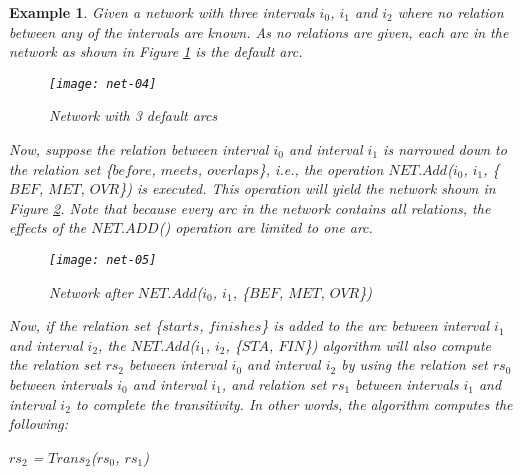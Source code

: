 \documentclass[11pt]{report}
\newtheorem{vexample}{Example}[chapter]
\newenvironment{vquote}
{
  \begin{list}{}{\leftmargin 1em}\item[]
}
{
  \end{list}
}
\begin{document}
          \begin{vexample}
            \label{ex-4-1}
            Given a network with three intervals $i_0$, $i_1$ and $i_2$ where
            no relation between any of the intervals are known. As no relations
            are given, each arc in the network as shown in Figure
            \ref{fig-net-ex-04} is the default arc.

            \begin{figure}[tbhp]
              \begin{center}
                \texttt{[image: net-04]}
                \caption{Network with 3 default arcs}
                \label{fig-net-ex-04}
              \end{center}
            \end{figure}

            Now, suppose the relation between interval $i_0$ and interval $i_1$
            is narrowed down to the relation set \{$before$, $meets$,
            $overlaps$\}, i.e., the operation $NET.Add$($i_0$, $i_1$, \{$BEF$,
            $MET$, $OVR$\}) is executed. This operation will yield the network
            shown in Figure \ref{fig-net-ex-05}. Note that because every arc
            in the network contains all relations, the effects of the
            $NET.ADD$() operation are limited to one arc.

            \begin{figure}[tbhp]
              \begin{center}
                \texttt{[image: net-05]}
                \caption{Network after $NET.Add$($i_0$, $i_1$, \{$BEF$, $MET$, $OVR$\})}
                \label{fig-net-ex-05}
              \end{center}
            \end{figure}

            Now, if the relation set \{$starts$, $finishes$\} is added to the
            arc between interval $i_1$ and interval $i_2$, the $NET.Add$($i_1$,
            $i_2$, \{$STA$, $FIN$\}) algorithm will also compute the relation
            set $rs_2$ between interval $i_0$ and interval $i_2$ by using the
            relation set $rs_0$ between intervals $i_0$ and interval $i_1$, and
            relation set $rs_1$ between intervals $i_1$ and interval $i_2$ to
            complete the transitivity. In other words, the algorithm computes
            the following:

            \begin{vquote}
              $rs_2$ = $Trans_2$($rs_0$, $rs_1$)


\end{vquote}
\end{vexample}
\end{document}
